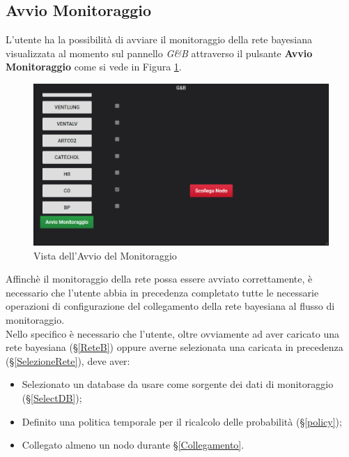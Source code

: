 \subsection{Avvio Monitoraggio}\label{Avvio}

L'utente ha la possibilità di avviare il monitoraggio della rete bayesiana visualizzata al momento sul pannello \textit{G\&B} attraverso il pulsante \textbf{Avvio Monitoraggio} come si vede in Figura \ref{AvvioMonitoraggio}.

\begin{figure}[H]
	\begin{center}
		\includegraphics[scale=0.7]{./images/AvvioMonitoraggio.png}
		 \caption{Vista dell'Avvio del Monitoraggio}	
		 \label{AvvioMonitoraggio}
	\end{center}
\end{figure}

Affinchè il monitoraggio della rete possa essere avviato correttamente, è necessario che l'utente abbia in precedenza completato tutte le necessarie operazioni di configurazione del collegamento della rete bayesiana al flusso di monitoraggio.\\
Nello specifico è necessario che l'utente, oltre ovviamente ad aver caricato una rete bayesiana (§\ref{ReteB}) oppure averne selezionata una caricata in precedenza (§\ref{SelezioneRete}), deve aver:
\begin{itemize}
	\item Selezionato un database da usare come sorgente dei dati di monitoraggio (§\ref{SelectDB});
	\item Definito una politica temporale per il ricalcolo delle probabilità (§\ref{policy});
	\item Collegato almeno un nodo durante §\ref{Collegamento}.
\end{itemize} 

